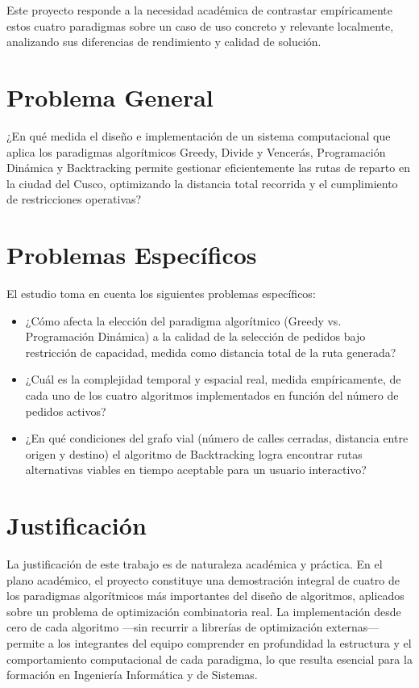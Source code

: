 Este proyecto responde a la necesidad académica de contrastar empíricamente estos cuatro paradigmas sobre un caso de uso concreto y relevante localmente, analizando sus diferencias de rendimiento y calidad de solución.

\section{Problema General}

¿En qué medida el diseño e implementación de un sistema computacional que aplica los paradigmas algorítmicos Greedy, Divide y Vencerás, Programación Dinámica y Backtracking permite gestionar eficientemente las rutas de reparto en la ciudad del Cusco, optimizando la distancia total recorrida y el cumplimiento de restricciones operativas?

\section{Problemas Específicos}

El estudio toma en cuenta los siguientes problemas específicos:
\begin{itemize}
    \item ¿Cómo afecta la elección del paradigma algorítmico (Greedy vs. Programación Dinámica) a la calidad de la selección de pedidos bajo restricción de capacidad, medida como distancia total de la ruta generada?
    \item ¿Cuál es la complejidad temporal y espacial real, medida empíricamente, de cada uno de los cuatro algoritmos implementados en función del número de pedidos activos?
    \item ¿En qué condiciones del grafo vial (número de calles cerradas, distancia entre origen y destino) el algoritmo de Backtracking logra encontrar rutas alternativas viables en tiempo aceptable para un usuario interactivo?
\end{itemize}

\section{Justificación}

La justificación de este trabajo es de naturaleza académica y práctica. En el plano académico, el proyecto constituye una demostración integral de cuatro de los paradigmas algorítmicos más importantes del diseño de algoritmos, aplicados sobre un problema de optimización combinatoria real. La implementación desde cero de cada algoritmo —sin recurrir a librerías de optimización externas— permite a los integrantes del equipo comprender en profundidad la estructura y el comportamiento computacional de cada paradigma, lo que resulta esencial para la formación en Ingeniería Informática y de Sistemas.

